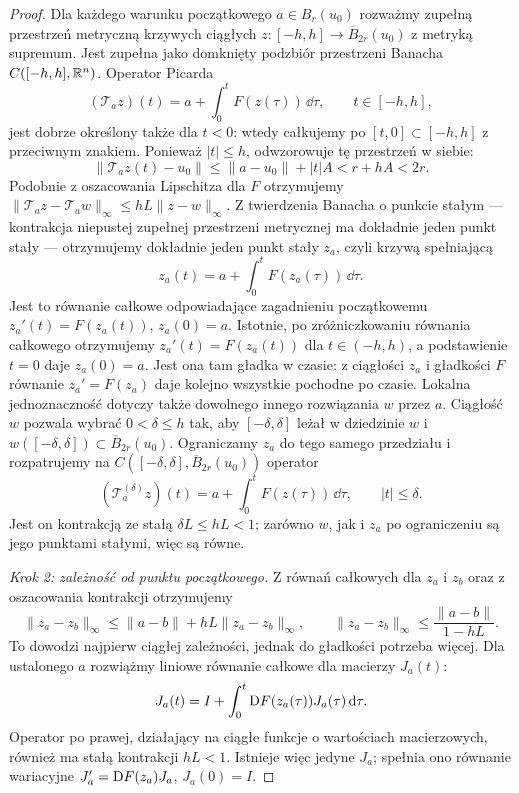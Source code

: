 \begin{proof}
Dla każdego warunku początkowego $a\in B_r(u_0)$ rozważmy
zupełną przestrzeń metryczną krzywych ciągłych
$z\colon[-h,h]\to\overline B_{2r}(u_0)$ z metryką supremum.
Jest zupełna jako domknięty podzbiór przestrzeni Banacha
$C([-h,h],\mathbb{R}^n)$.
Operator Picarda
\[
 (\mathcal T_a z)(t)=a+\int_0^t F(z(\tau))\,\dd\tau,
 \qquad t\in[-h,h],
\]
jest dobrze określony także dla $t<0$: wtedy całkujemy po
$[t,0]\subset[-h,h]$ z przeciwnym znakiem. Ponieważ $|t|\leq h$,
odwzorowuje tę przestrzeń w siebie:
\[
 \|\mathcal T_a z(t)-u_0\|
 \leq\|a-u_0\|+|t|A<r+hA<2r.
\]
Podobnie z oszacowania Lipschitza dla $F$ otrzymujemy
$\|\mathcal T_a z-\mathcal T_a w\|_\infty
 \leq hL\|z-w\|_\infty$.
Z twierdzenia Banacha o punkcie stałym --- kontrakcja niepustej
zupełnej przestrzeni metrycznej ma dokładnie jeden punkt stały ---
otrzymujemy dokładnie jeden punkt stały $z_a$, czyli krzywą spełniającą
\[
 z_a(t)=a+\int_0^t F(z_a(\tau))\,\dd\tau.
\]
Jest to równanie całkowe odpowiadające zagadnieniu początkowemu
$z_a'(t)=F(z_a(t))$, $z_a(0)=a$. Istotnie, po zróżniczkowaniu
równania całkowego otrzymujemy $z_a'(t)=F(z_a(t))$ dla
$t\in(-h,h)$, a podstawienie $t=0$ daje $z_a(0)=a$.
Jest ona tam gładka w czasie: z ciągłości $z_a$ i gładkości $F$
równanie $z_a'=F(z_a)$ daje kolejno wszystkie pochodne po czasie.
Lokalna jednoznaczność dotyczy także dowolnego innego rozwiązania
$w$ przez $a$. Ciągłość $w$ pozwala wybrać $0<\delta\leq h$ tak,
aby $[-\delta,\delta]$ leżał w dziedzinie $w$ i
$w([-\delta,\delta])\subset\overline B_{2r}(u_0)$.
Ograniczamy $z_a$ do tego samego przedziału i rozpatrujemy na
$C([-\delta,\delta],\overline B_{2r}(u_0))$ operator
\[
 (\mathcal T_a^{(\delta)}z)(t)
 =a+\int_0^t F(z(\tau))\,\dd\tau,\qquad |t|\leq\delta.
\]
Jest on kontrakcją ze stałą $\delta L\leq hL<1$; zarówno $w$,
jak i $z_a$ po ograniczeniu są jego punktami stałymi, więc są równe.

\emph{Krok 2: zależność od punktu początkowego.}
Z równań całkowych dla $z_a$ i $z_b$ oraz z oszacowania
kontrakcji otrzymujemy
\[
 \|z_a-z_b\|_\infty
 \leq \|a-b\|+hL\|z_a-z_b\|_\infty,
 \qquad
 \|z_a-z_b\|_\infty\leq\frac{\|a-b\|}{1-hL}.
\]
To dowodzi najpierw ciągłej zależności, jednak do gładkości
potrzeba więcej. Dla ustalonego $a$ rozwiążmy liniowe
równanie całkowe dla macierzy $J_a(t)$:
\[
 J_a(t)=I+\int_0^t\mathrm D F(z_a(\tau))J_a(\tau)\,\mathrm d\tau.
\]
Operator po prawej, działający na ciągłe funkcje o wartościach
macierzowych, również ma stałą kontrakcji $hL<1$.
Istnieje więc jedyne $J_a$; spełnia ono równanie
wariacyjne $J_a'=\mathrm D F(z_a)J_a$, $J_a(0)=I$.


\end{proof}
